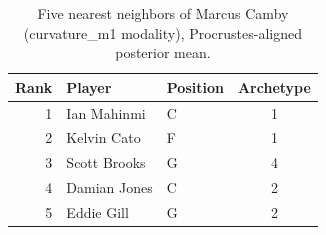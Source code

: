\begin{table}[htbp]
  \centering\small
  \begin{tabular}{rllc}
    \toprule
    Rank & Player & Position & Archetype \\
    \midrule
    1 & Ian Mahinmi & C & 1 \\
    2 & Kelvin Cato & F & 1 \\
    3 & Scott Brooks & G & 4 \\
    4 & Damian Jones & C & 2 \\
    5 & Eddie Gill & G & 2 \\
    \bottomrule
  \end{tabular}
  \caption{Five nearest neighbors of Marcus Camby (curvature_m1 modality), Procrustes-aligned posterior mean.}
  \label{tab:Marcus_Camby_neighbors_curvature_m1}
\end{table}

